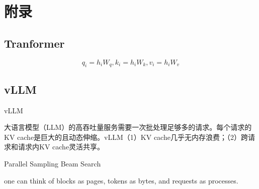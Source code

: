 \documentclass[letterpaper,11pt]{article}
\numberwithin{equation}{section}
\begin{document}
\section{附录}

\subsection{Tranformer}

\begin{equation}
    q_i = h_i W_q, k_i = h_i W_k, v_i = h_i W_v
\end{equation}

\subsection{vLLM}

vLLM\cite{kwon2023efficientmemorymanagementlarge}

大语言模型（LLM）的高吞吐量服务需要一次批处理足够多的请求。每个请求的KV cache是巨大的且动态伸缩。vLLM（1）KV cache几乎无内存浪费；（2）跨请求和请求内KV cache灵活共享。

Parallel Sampling Beam Search

one can think of blocks as pages, tokens as bytes, and requests as processes.

\printbibliography[title={引用}]
\end{document}
